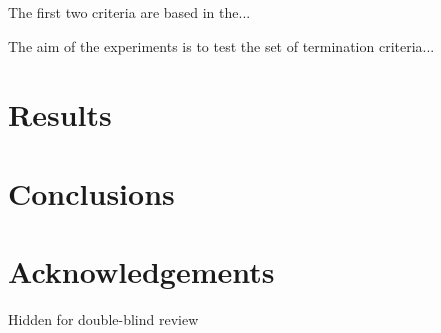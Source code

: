 \documentclass[runningheads,a4paper]{llncs}
\begin{document}
The first two criteria are based in the...

The aim of the experiments is to test the set of termination criteria...


\section{Results}
\label{sec:res}

\section{Conclusions}

\section*{Acknowledgements}

Hidden for double-blind review



\end{document}
